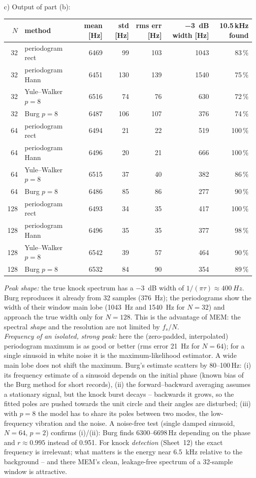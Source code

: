 \begin{solution}
c) Output of part (b):
\begin{center}
\small
\begin{tabular}{@{}rlrrrrr@{}}
\toprule
$N$ & method & mean [Hz] & std [Hz] & rms err [Hz] & \SI{-3}{dB} width [Hz] & 10.5\,kHz found\\
\midrule
32 & periodogram rect & 6469 & 99 & 103 & 1043 & 83\,\%\\
32 & periodogram Hann & 6451 & 130 & 139 & 1540 & 75\,\%\\
32 & Yule--Walker $p=8$ & 6516 & 74 & 76 & 630 & 72\,\%\\
32 & Burg $p=8$ & 6487 & 106 & 107 & 376 & 74\,\%\\
\midrule
64 & periodogram rect & 6494 & 21 & 22 & 519 & 100\,\%\\
64 & periodogram Hann & 6496 & 20 & 21 & 666 & 100\,\%\\
64 & Yule--Walker $p=8$ & 6515 & 37 & 40 & 382 & 86\,\%\\
64 & Burg $p=8$ & 6486 & 85 & 86 & 277 & 90\,\%\\
\midrule
128 & periodogram rect & 6493 & 34 & 35 & 417 & 100\,\%\\
128 & periodogram Hann & 6496 & 35 & 35 & 377 & 98\,\%\\
128 & Yule--Walker $p=8$ & 6542 & 39 & 57 & 464 & 90\,\%\\
128 & Burg $p=8$ & 6532 & 84 & 90 & 354 & 89\,\%\\
\bottomrule
\end{tabular}
\end{center}
\emph{Peak shape:} the true knock spectrum has a \SI{-3}{dB} width of
$1/(\pi\tau)\approx\SI{400}{Hz}$. Burg reproduces it already from 32 samples
(\SI{376}{Hz}); the periodograms show the width of their window main lobe
(\SI{1043}{Hz} and \SI{1540}{Hz} for $N=32$) and approach the true width only for
$N=128$. This is the advantage of MEM: the spectral \emph{shape} and the resolution are
not limited by $f_s/N$.\\
\emph{Frequency of an isolated, strong peak:} here the (zero-padded, interpolated)
periodogram maximum is as good or better (rms error \SI{21}{Hz} for $N=64$); for a
single sinusoid in white noise it is the maximum-likelihood estimator. A wide main
lobe does not shift the maximum. Burg's estimate scatters by 80--100\,Hz: (i) its
frequency estimate of a sinusoid depends on the initial phase (known bias of the Burg
method for short records), (ii) the forward--backward averaging assumes a stationary
signal, but the knock burst decays -- backwards it grows, so the fitted poles are
pushed towards the unit circle and their angles are disturbed; (iii) with $p=8$ the
model has to share its poles between two modes, the low-frequency vibration and the
noise. A noise-free test (single damped sinusoid, $N=64$, $p=2$) confirms (i)/(ii):
Burg finds 6300--6698\,Hz depending on the phase and $r\approx0.995$ instead of 0.951.
For knock \emph{detection} (Sheet~12) the exact frequency is irrelevant; what matters is
the energy near \SI{6.5}{kHz} relative to the background -- and there MEM's clean,
leakage-free spectrum of a 32-sample window is attractive.


\end{solution}
